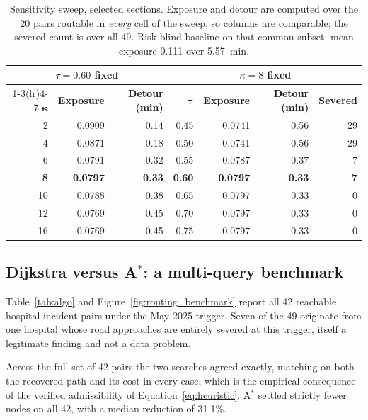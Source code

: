 \documentclass[11pt,a4paper]{article}
\begin{document}
\begin{table}[t]
\centering
\caption{Sensitivity sweep, selected sections. Exposure and detour are computed
over the 20 pairs routable in \emph{every} cell of the sweep, so columns are
comparable; the severed count is over all 49. Risk-blind baseline on that common
subset: mean exposure 0.111 over \SI{5.57}{\minute}.}
\label{tab:sensitivity}
\small
\begin{tabular}{@{}rrr@{\qquad\qquad}rrrr@{}}
\toprule
\multicolumn{3}{c}{\textbf{$\tau = 0.60$ fixed}} &
\multicolumn{4}{c}{\textbf{$\kappa = 8$ fixed}} \\
\cmidrule(lr){1-3}\cmidrule(lr){4-7}
$\boldsymbol{\kappa}$ & \textbf{Exposure} & \textbf{Detour (min)} &
$\boldsymbol{\tau}$ & \textbf{Exposure} & \textbf{Detour (min)} & \textbf{Severed} \\
\midrule
2  & 0.0909 & 0.14 & 0.45 & 0.0741 & 0.56 & 29 \\
4  & 0.0871 & 0.18 & 0.50 & 0.0741 & 0.56 & 29 \\
6  & 0.0791 & 0.32 & 0.55 & 0.0787 & 0.37 & 7 \\
\textbf{8}  & \textbf{0.0797} & \textbf{0.33} & \textbf{0.60} & \textbf{0.0797} & \textbf{0.33} & \textbf{7} \\
10 & 0.0788 & 0.38 & 0.65 & 0.0797 & 0.33 & 0 \\
12 & 0.0769 & 0.45 & 0.70 & 0.0797 & 0.33 & 0 \\
16 & 0.0769 & 0.45 & 0.75 & 0.0797 & 0.33 & 0 \\
\bottomrule
\end{tabular}
\end{table}

\subsection{Dijkstra versus A$^\ast$: a multi-query benchmark}
\label{sec:res-algo}

Table~\ref{tab:algo} and Figure~\ref{fig:routing_benchmark} report all 42
reachable hospital-incident pairs under the May 2025 trigger. Seven of the 49
originate from one hospital whose road approaches are entirely severed at this
trigger, itself a legitimate finding and not a data problem.

Across the full set of 42 pairs the two searches agreed exactly, matching on both
the recovered path and its cost in every case, which is the empirical consequence
of the verified admissibility of Equation~\eqref{eq:heuristic}. A$^\ast$ settled
strictly fewer nodes on all 42, with a median reduction of 31.1\%.
\end{document}
